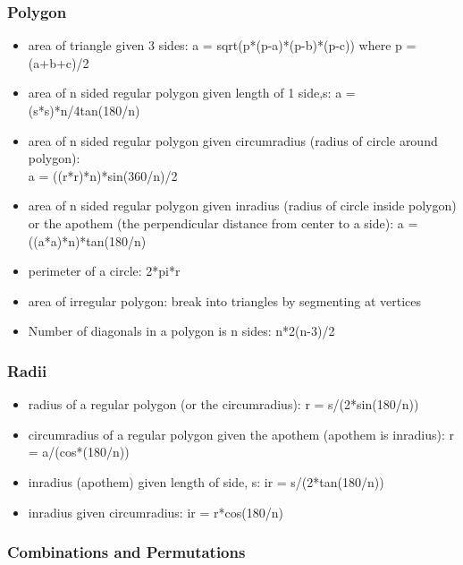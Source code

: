 \subsubsection{Polygon}
\begin{itemize}
\item area of triangle given 3 sides:  a = sqrt(p*(p-a)*(p-b)*(p-c)) where p = (a+b+c)/2
\item area of n sided regular polygon given length of 1 side,s: a = (s*s)*n/4tan(180/n)
\item area of n sided regular polygon given circumradius (radius of circle around polygon): \\ a = ((r*r)*n)*sin(360/n)/2
\item area of n sided regular polygon given inradius (radius of circle inside polygon) or the apothem (the perpendicular distance from center to a side): a = ((a*a)*n)*tan(180/n)
\item perimeter of a circle: 2*pi*r
\item area of irregular polygon: break into triangles by segmenting at vertices
\item Number of diagonals in a polygon is n sides: n*2(n-3)/2
\end{itemize}

\subsubsection{Radii}
\begin{itemize}
\item radius of a regular polygon (or the circumradius): r = s/(2*sin(180/n))
\item circumradius of a regular polygon given the apothem (apothem is inradius): r = a/(cos*(180/n))
\item inradius (apothem) given length of side, s: ir = s/(2*tan(180/n))
\item inradius given circumradius: ir = r*cos(180/n)
\end{itemize}

\subsubsection{Combinations and Permutations}


